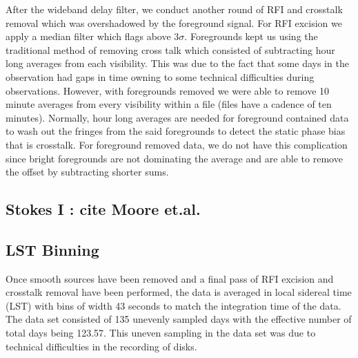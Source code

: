 \documentclass[twocolumn,numberedappendix]{emulateapj}
\begin{document}
After the wideband delay filter, we conduct another round of RFI and crosstalk
removal which was overshadowed by the foreground signal. For RFI excision we
apply a median filter which flags above $3\sigma$. Foregrounds kept us using the
traditional method of removing cross talk which consisted of subtracting hour
long averages from each visibility. This was due to the fact that some days in
the observation had gaps in time owning to some technical difficulties during
observations. However, with foregrounds removed we were able to remove 10 minute
averages from every visibility within a file (files have a cadence of ten
minutes). Normally, hour long averages are needed for foreground contained data
to wash out the fringes from the said foregrounds to detect the static phase
bias that is crosstalk. For foreground removed data, we do not have this
complication since bright foregrounds are not dominating the average and are
able to remove the offset by subtracting shorter sums.

\subsection{Stokes I : cite Moore et.al.}
\subsection{LST Binning}

Once smooth sources have been removed and a final pass of RFI excision and
crosstalk removal have been performed, the data is averaged in local sidereal
time (LST) with bins of width 43 seconds to match the integration time of the
data. The data set consisted of 135 unevenly sampled days with the effective
number of total days being 123.57. This uneven sampling in the data set was due
to technical difficulties in the recording of disks.
\end{document}
